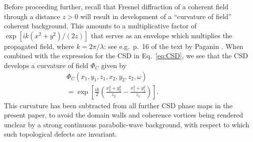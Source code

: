 \documentclass[%
 reprint,
 amsmath,amssymb,
 aps,
]{revtex4-1}
\begin{document}
% 

Before proceeding further, recall that Fresnel diffraction of a coherent field through a distance $z>0$ will result in development of a ``curvature of field'' coherent background.  This  amounts to a multiplicative factor of $\exp[ik(x^2+y^2)/(2z)]$ that serves as an envelope which multiplies the propagated field, where $k=2\pi/\lambda$: see e.g.~p.~16 of the text by Paganin \cite{paganin_book}.  When combined with the expression for the CSD in Eq.~\ref{eq:CSD}, we see that the CSD develops a curvature of field $\Phi_C$ given by
%
\begin{eqnarray}
\nonumber\Phi_C(x_1,y_1,z_1,x_2,y_2,z_2,\omega) \quad\quad\quad\quad\quad\quad \\ =\exp\left[\frac{ik}{2}\left(\frac{x_2^2+y_2^2}{z_2}-\frac{x_1^2+y_1^2}{z_1}\right)\right].    
\label{eq:CSD-curvature-of-field}
\end{eqnarray}
%
This curvature has been subtracted from all further CSD phase maps in the present paper, to avoid the domain walls and coherence vortices being rendered unclear by a strong continuous parabolic-wave background, with respect to which such topological defects are invariant.  
\end{document}
